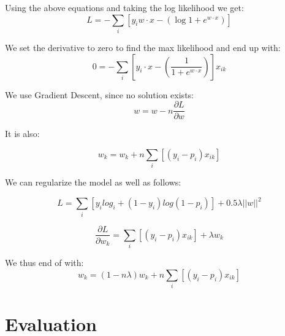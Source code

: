 Using the above equations and taking the log likelihood we get:
\begin{equation}
L= -\sum_i[y_iw\cdot x -(\log{1 + e^{w \cdot x}})]
\end{equation}

We set the derivative to zero to find the max likelihood and end up with:
\begin{equation}
0 = -\sum_i[y_i\cdot x -(\frac{1}{1 + e^{w \cdot x}})]x_{ik}
\end{equation}

We use Gradient Descent, since no solution exists:
\begin{equation}
w = w - n\frac{\partial L}{\partial w}
\end{equation}

It is also:

\begin{equation}
w_k  = w_k + n\sum_i[(y_i - p_i)x_{ik}]
\end{equation}

We can regularize the model as well as follows:

\begin{equation}
L = \sum_i [y_i log _i+(1-y_i)log(1-p_i)]+0.5\lambda{}||w||^{2}
\end{equation}

\begin{equation}
\frac{\partial L}{\partial w_k}=\sum_i[(y_i-p_i)x_{ik}]+\lambda{}w_k 
\end{equation}

We thus end of with: 
\begin{equation}
w_k = (1 - n\lambda{})w_k + n \sum_i[(y_i-p_i)x_{ik}]
\end{equation}


\section{Evaluation}

